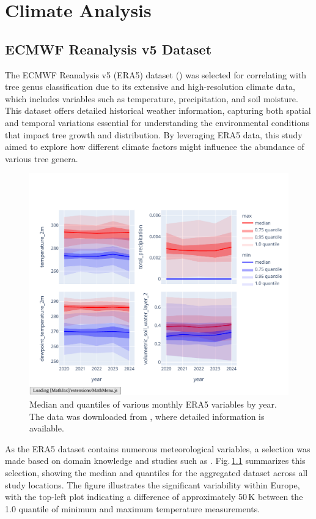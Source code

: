 \chapter{Climate Analysis}
\label{chapter:climate}
\section{ECMWF Reanalysis v5 Dataset}

The ECMWF Reanalysis v5 (ERA5) dataset (\cite{era5}) was selected for correlating with tree genus classification due to its extensive and high-resolution climate data, which includes variables such as temperature, precipitation, and soil moisture. This dataset offers detailed historical weather information, capturing both spatial and temporal variations essential for understanding the environmental conditions that impact tree growth and distribution. By leveraging ERA5 data, this study aimed to explore how different climate factors might influence the abundance of various tree genera.

\begin{figure}[ht]
    \centering
    \includegraphics[width=0.9\linewidth, trim={20pt 20pt 10pt 40pt}, clip]{figures/figures_climate/selected_variables_stats.pdf}
    \caption{Median and quantiles of various monthly ERA5 variables by year. The data was downloaded from \cite{era5_dataset}, where detailed information is available.}
    \label{fig:selected_variables_stats}
\end{figure}

As the ERA5 dataset contains numerous meteorological variables, a selection was made based on domain knowledge and studies such as \cite{climate_choice}. Fig.\,\ref{fig:selected_variables_stats} summarizes this selection, showing the median and quantiles for the aggregated dataset across all study locations. The figure illustrates the significant variability within Europe, with the top-left plot indicating a difference of approximately 50\,K between the 1.0 quantile of minimum and maximum temperature measurements.

